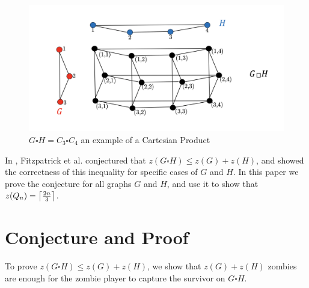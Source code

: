 \documentclass[1p]{elsarticle}
\DeclarePairedDelimiter\ceil{\lceil}{\rceil} \DeclarePairedDelimiter\floor{\lfloor}{\rfloor}
\begin{document}
\begin{figure}[h!]
	\centering
	\includegraphics[width=0.9\linewidth]{fig/CpWest.png}
	\caption{$G \square H = C_3 \square C_4$ an example of a Cartesian Product}
	\label{fig:p2}
\end{figure}

In \cite{Fitz16}, Fitzpatrick et al. conjectured that $z(G \square H) \leq z(G) + z(H)$, and showed the correctness of
this inequality for specific cases of $G$ and $H$. In this paper we prove the conjecture for all graphs $G$ and $H$, and
use it to show that $z(Q_n) =  \ceil*{\frac{2n}{3}}$. 





\section{Conjecture and Proof}\label{conj-proof}

To prove $z(G \square H) \leq z(G) + z(H)$, we show that $z(G) + z(H)$ zombies are enough for the zombie player to
capture the survivor on $G \square H$.
\end{document}
